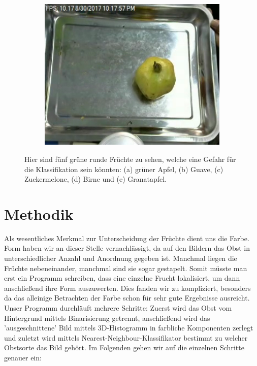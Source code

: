 \documentclass[a4,german]{article}
\begin{document}
\begin{figure}[b]
\begin{subfigure}[c]{0.19\textwidth}
\includegraphics[width=1\textwidth]{Pomegranate_534.png}
\subcaption{}
\end{subfigure}
\caption{Hier sind fünf grüne runde Früchte zu sehen, welche eine Gefahr für die Klassifikation sein könnten: (a) grüner Apfel, (b) Guave, (c) Zuckermelone, (d) Birne und (e) Granatapfel.}
\end{figure}

\section{Methodik}

Als wesentliches Merkmal zur Unterscheidung der Früchte dient uns die Farbe. Form haben wir an dieser Stelle vernachlässigt, da auf den Bildern das Obst in unterschiedlicher Anzahl und Anordnung gegeben ist. Manchmal liegen die Früchte nebeneinander, manchmal sind sie sogar gestapelt. Somit müsste man erst ein Programm schreiben, dass eine einzelne Frucht lokalisiert, um dann anschließend ihre Form auszuwerten. Dies fanden wir zu kompliziert, besonders da das alleinige Betrachten der Farbe schon für sehr gute Ergebnisse ausreicht.\\
Unser Programm durchläuft mehrere Schritte: Zuerst wird das Obst vom Hintergrund mittels Binarisierung getrennt, anschließend wird das 'ausgeschnittene' Bild mittels 3D-Histogramm in farbliche Komponenten zerlegt und zuletzt wird mittels Nearest-Neighbour-Klassifikator bestimmt zu welcher Obstsorte das Bild gehört. Im Folgenden gehen wir auf die einzelnen Schritte genauer ein:\\
\end{document}
